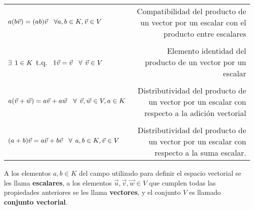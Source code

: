 \documentclass[notasLineal]{subfiles}
\begin{document}
\begin{tcolorbox}[breakable]
\begin{Def}
\begin{center}
\begin{tabular}{lr}
            \multirow{2}{0.35\textwidth}{$a(b\vec{v})=(ab)\vec{v}\hspace{3mm}\forall a,b\in K, \vec{v}\in V$} & \multirow{2}{0.47\textwidth}{Compatibilidad del producto de un vector por un escalar con el producto entre escalares} \\ \\ \\
            \multirow{2}{0.4\textwidth}{$\exists\hspace{1.5mm}1\in K$ \hspace{1.5mm} t.q. $\hspace{1.5mm}1\vec{v}=\vec{v}\hspace{3mm}\forall\hspace{1.5mm} \vec{v}\in V$} & \multirow{2}{0.35\textwidth}{Elemento identidad del producto de un vector por un escalar} \\ \\ \\
            \multirow{2}{0.4\textwidth}{$a(\vec{v}+\vec{w})=a\vec{v}+a\vec{w}\hspace{3mm}\forall\hspace{1.5mm} \vec{v},\vec{w}\in V, a\in K$} & \multirow{2}{0.47\textwidth}{Distributividad del producto de un vector por un escalar con respecto a la adición vectorial}  \\ \\ \\
            \multirow{2}{0.4\textwidth}{$(a+b)\vec{v}=a\vec{v}+b\vec{v}\hspace{3mm}\forall\hspace{1.5mm} a,b\in K, \vec{v}\in V$} & \multirow{2}{0.47\textwidth}{Distributividad del producto de un vector por un escalar con respecto a la suma escalar.} \\ \\
        \end{tabular}
        \end{center}
        
        A los elementos $a,b \in K$ del campo utilizado para definir el espacio vectorial se les llama \textbf{escalares}, a los elementos $\vec{u},\vec{v},\vec{w}\in V$ que cumplen todas las propiedades anteriores se les llama \textbf{vectores}, y el conjunto $V$ es llamado \textbf{conjunto vectorial}.
    \end{Def}
\end{tcolorbox}
\end{document}
